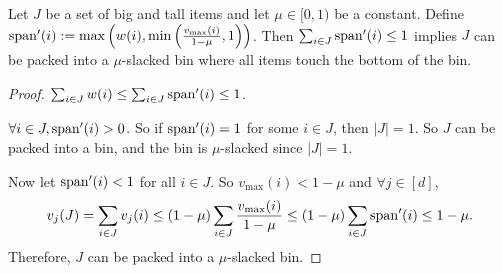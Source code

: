 \begin{lemma}
\label{lem:bot-slack-pack}
Let $J$ be a set of big and tall items and let $\mu \in [0, 1)$ be a constant.
Define $\operatorname{span}'(i) := \max\left(w(i), \min\left(\frac{v_{\max}(i)}{1-\mu}, 1\right)\right)$.
Then $\sum_{i \in J} \operatorname{span}'(i) \le 1$ implies $J$ can be packed into
a $\mu$-slacked bin where all items touch the bottom of the bin.
\end{lemma}
\begin{proof}
$\sum_{i \in J} w(i) \le \sum_{i \in J} \operatorname{span}'(i) \le 1$.

$\forall i \in J, \operatorname{span}'(i) > 0$.
So if $\operatorname{span}'(i) = 1$ for some $i \in J$, then $|J| = 1$.
So $J$ can be packed into a bin, and the bin is $\mu$-slacked since $|J| = 1$.

Now let $\operatorname{span}'(i) < 1$ for all $i \in J$. So $v_{\max}(i) < 1-\mu$ and $\forall j \in [d]$,
\[ v_j(J) = \sum_{i \in J} v_j(i) \le (1-\mu) \sum_{i \in J} \frac{v_{\max}(i)}{1-\mu}
\le (1-\mu) \sum_{i \in J} \operatorname{span}'(i) \le 1-\mu. \]
Therefore, $J$ can be packed into a $\mu$-slacked bin.
\end{proof}

